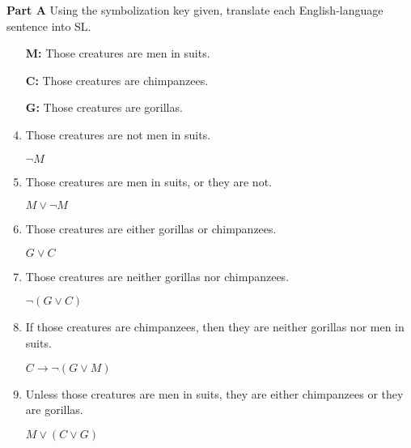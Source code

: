 \documentclass[12pt, letterpaper, twoside]{article}
\begin{document}
\textbf{Part A} Using the symbolization key given, translate
each English-language sentence into SL.
\begin{enumerate}
	\item[\textbf{M:}] Those creatures are men in suits.
	\item[\textbf{C:}] Those creatures are chimpanzees.
	\item[\textbf{G:}] Those creatures are gorillas.

	\item Those creatures are not men in suits.

	$\neg M$

	\item Those creatures are men in suits, or they are
          not.

	$M \vee \neg M$

	\item Those creatures are either gorillas or
          chimpanzees.

	$G \vee C$

	\item Those creatures are neither gorillas nor
          chimpanzees.

	$\neg (G \vee C)$

	\item If those creatures are chimpanzees, then they
          are neither gorillas nor men in suits.

	$C \rightarrow \neg (G \vee M)$

	\item Unless those creatures are men in suits, they
          are either chimpanzees or they are gorillas.

	$M \vee (C \vee G)$
\end{enumerate}
\end{document}
